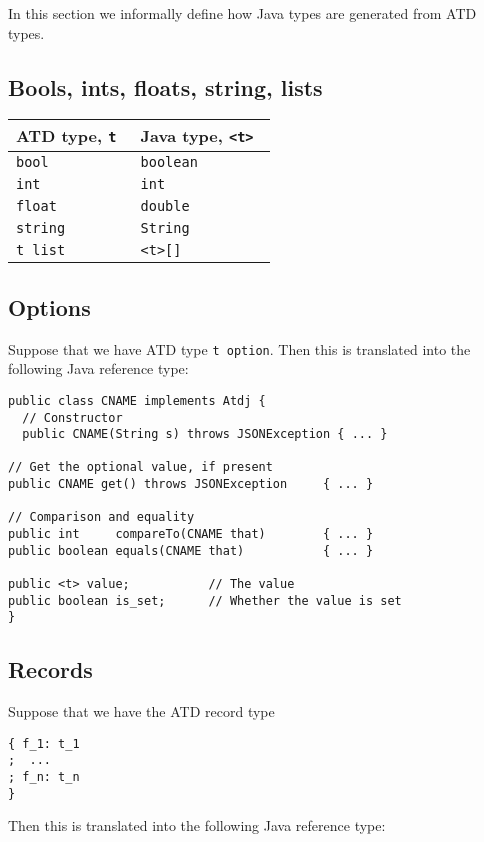 In this section we informally define how Java types are generated from ATD
types.

\subsection{Bools, ints, floats, string, lists}

\begin{tabular}{ll}
\toprule
ATD type, \tt t & Java type, \tt <t> \\
\midrule
\tt bool     & \tt boolean \\
\tt int      & \tt int \\
\tt float    & \tt double \\
\tt string   & \tt String \\
\tt t list   & \tt <t>[] \\
\bottomrule
\end{tabular}

\subsection{Options}

Suppose that we have ATD type \texttt{t option}.  Then this is
translated into the following Java reference type:

\begin{verbatim}
public class CNAME implements Atdj {
  // Constructor
  public CNAME(String s) throws JSONException { ... }

// Get the optional value, if present
public CNAME get() throws JSONException     { ... }

// Comparison and equality
public int     compareTo(CNAME that)        { ... }
public boolean equals(CNAME that)           { ... }

public <t> value;           // The value
public boolean is_set;      // Whether the value is set
}
\end{verbatim}

\subsection{Records}

Suppose that we have the ATD record type

\begin{verbatim}
{ f_1: t_1
;  ...
; f_n: t_n
}
\end{verbatim}

Then this is translated into the following Java reference type:

